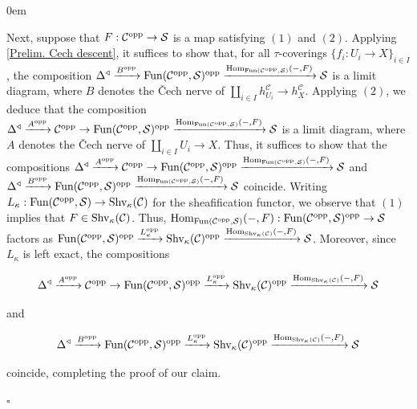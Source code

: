 \documentclass[10pt]{article}
\newcommand{\mS}{\mathcal S}
\newcommand{\C}{\mathcal C}
\renewcommand{\qed}{\hfill$\square$}
\renewenvironment{proof}{\begin{addmargin}[1em]{0em}\begin{newproof}}{\end{newproof}\end{addmargin}\qed}
\theoremstyle{witharg}
\theoremstyle{witharg}
\theoremstyle{witharg2}
\begin{document}
\begin{proof}
     Next, suppose that $F:\C^{\textnormal{opp}}\rightarrow \mS$ is a map satisfying $(1)$ and $(2)$. Applying \ref{Prelim. Cech descent}, it suffices to show that, for all $\tau$-coverings $\{f_i:U_i\rightarrow X\}_{i\in I}$, the composition $\Delta^\triangleleft \xrightarrow{B^{\textnormal{opp}}}\textnormal{Fun}(\C^{\textnormal{opp}},\mS)^{\textnormal{opp}}\xrightarrow{\textnormal{Hom}_{\textnormal{Fun}(\C^{\textnormal{opp}},\mS)}(-,F)}\mS$ is a limit diagram, where $B$ denotes the \v{C}ech nerve of  $\coprod_{i\in I}h^\C_{U_i}\rightarrow h^\C_X$. Applying $(2)$, we deduce that the composition $\Delta^\triangleleft \xrightarrow{A^{\textnormal{opp}}}\C^{\textnormal{opp}}\rightarrow \textnormal{Fun}(\C^{\textnormal{opp}},\mS)^{\textnormal{opp}}\xrightarrow{\textnormal{Hom}_{\textnormal{Fun}(\C^{\textnormal{opp}},\mS)}(-,F)}\mS$ is a limit diagram, where $A$ denotes the \v{C}ech nerve of $\coprod_{i\in I}U_i\rightarrow X$. Thus, it suffices to show that the compositions $\Delta^\triangleleft \xrightarrow{A^{\textnormal{opp}}}\C^{\textnormal{opp}}\rightarrow \textnormal{Fun}(\C^{\textnormal{opp}},\mS)^{\textnormal{opp}}\xrightarrow{\textnormal{Hom}_{\textnormal{Fun}(\C^{\textnormal{opp}},\mS)}(-,F)}\mS$ and $\Delta^\triangleleft \xrightarrow{B^{\textnormal{opp}}}\textnormal{Fun}(\C^{\textnormal{opp}},\mS)^{\textnormal{opp}}\xrightarrow{\textnormal{Hom}_{\textnormal{Fun}(\C^{\textnormal{opp}},\mS)}(-,F)}\mS$ coincide. Writing $L_\kappa:\textnormal{Fun}(\C^{\textnormal{opp}},\mS)\rightarrow \textnormal{Shv}_{\kappa}(\C)$ for the sheafification functor, we observe that $(1)$ implies that $F\in \textnormal{Shv}_{\kappa}(\C)$. Thus, $\textnormal{Hom}_{\textnormal{Fun}(\C^{\textnormal{opp}},\mS)}(-,F):\textnormal{Fun}(\C^{\textnormal{opp}},\mS)^{\textnormal{opp}}\rightarrow \mS$ factors as $\textnormal{Fun}(\C^{\textnormal{opp}},\mS)^{\textnormal{opp}}\xrightarrow{L_\kappa^{\textnormal{opp}}}\textnormal{Shv}_\kappa(\C)^{\textnormal{opp}}\xrightarrow{\textnormal{Hom}_{\textnormal{Shv}_\kappa(\C)}(-,F)}\mS$. Moreover, since $L_\kappa$ is left exact, the compositions 

     $$\Delta^\triangleleft \xrightarrow{A^{\textnormal{opp}}}\C^{\textnormal{opp}}\rightarrow \textnormal{Fun}(\C^{\textnormal{opp}},\mS)^{\textnormal{opp}}\xrightarrow{L_\kappa^{\textnormal{opp}}}\textnormal{Shv}_\kappa(\C)^{\textnormal{opp}}\xrightarrow{\textnormal{Hom}_{\textnormal{Shv}_\kappa(\C)}(-,F)}\mS$$

     \noindent and 

     $$\Delta^\triangleleft \xrightarrow{B^{\textnormal{opp}}}\textnormal{Fun}(\C^{\textnormal{opp}},\mS)^{\textnormal{opp}}\xrightarrow{L_\kappa^{\textnormal{opp}}}\textnormal{Shv}_\kappa(\C)^{\textnormal{opp}}\xrightarrow{\textnormal{Hom}_{\textnormal{Shv}_\kappa(\C)}(-,F)}\mS$$

     \noindent coincide, completing the proof of our claim. 
     
    
\end{proof}
\end{document}
